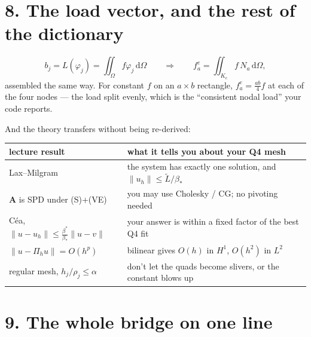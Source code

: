 \documentclass[11pt]{article}
\newcommand{\dOm}{\,\mathrm{d}\Omega}
\newcommand{\norm}[1]{\lVert #1\rVert}
\begin{document}
\section*{8. The load vector, and the rest of the dictionary}

\begin{equation}\label{eq:f}
  b_{j}=L(\varphi_{j})=\iint_{\Omega}f\varphi_{j}\dOm
  \qquad\Longrightarrow\qquad
  f^{e}_{a}=\iint_{K_{e}}f\,N_{a}\dOm ,
\end{equation}
assembled the same way. For constant $f$ on an $a\times b$ rectangle,
$f^{e}_{a}=\tfrac{ab}{4}f$ at each of the four nodes --- the load split evenly,
which is the ``consistent nodal load'' your code reports.

\medskip
And the theory transfers without being re-derived:

\begin{center}\small
\renewcommand{\arraystretch}{1.3}
\begin{tabular}{@{}ll@{}}
\toprule
lecture result & what it tells you about your Q4 mesh\\
\midrule
Lax--Milgram & the system has exactly one solution, and $\norm{u_{h}}\le\widetilde{L}/\beta_{*}$\\
$\bm{A}$ is SPD under (S)+(VE) & you may use Cholesky / CG; no pivoting needed\\
C\'ea, $\norm{u-u_{h}}\le\tfrac{\beta^{*}}{\beta_{*}}\norm{u-v}$ & your answer is within a fixed factor of the best Q4 fit\\
$\norm{u-\Pi_{h}u}=O(h^{p})$ & bilinear gives $O(h)$ in $H^{1}$, $O(h^{2})$ in $L^{2}$\\
regular mesh, $h_{j}/\rho_{j}\le\alpha$ & don't let the quads become slivers, or the constant blows up\\
\bottomrule
\end{tabular}
\label{tab:transfer}
\end{center}

\section*{9. The whole bridge on one line}
\end{document}
